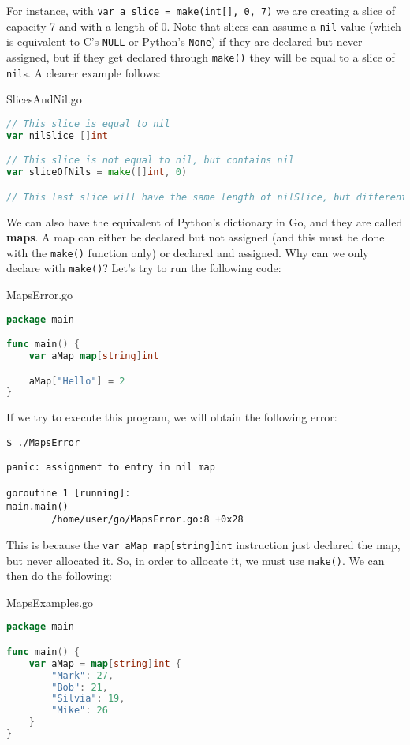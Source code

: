 \pagebreak
For instance, with \verb|var a_slice = make(int[], 0, 7)| we are creating a slice of capacity 7 and with a length of 0. Note that slices can assume a \verb|nil| value (which is equivalent to C's \verb|NULL| or Python's \verb|None|) if they are declared but never assigned, but if they get declared through \verb|make()| they will be equal to a slice of \verb|nil|s. A clearer example follows:

\begin{codeblock}{SlicesAndNil.go}
    \begin{lstlisting}[language = go]
// This slice is equal to nil
var nilSlice []int

// This slice is not equal to nil, but contains nil
var sliceOfNils = make([]int, 0)

// This last slice will have the same length of nilSlice, but different content\end{lstlisting}
\end{codeblock}

We can also have the equivalent of Python's dictionary in Go, and they are called \textbf{maps}. A map can either be declared but not assigned (and this must be done with the \verb|make()| function only) or declared and assigned. Why can we only declare with \verb|make()|? Let's try to run the following code:

\begin{codeblock}{MapsError.go}
    \begin{lstlisting}[language = go]
package main

func main() {
    var aMap map[string]int

    aMap["Hello"] = 2
}
    \end{lstlisting}
\end{codeblock}

If we try to execute this program, we will obtain the following error:

\begin{terminal}
    \begin{lstlisting}[style = notexterm]
 $ ./MapsError
    \end{lstlisting}
    \begin{tcolorbox}
        \begin{lstlisting}[basewidth=0.44em, numbers=none]
panic: assignment to entry in nil map

goroutine 1 [running]:
main.main()
        /home/user/go/MapsError.go:8 +0x28\end{lstlisting}
    \end{tcolorbox}
\end{terminal}

This is because the \verb|var aMap map[string]int| instruction just declared the map, but never allocated it. So, in order to allocate it, we must use \verb|make()|. We can then do the following:
\pagebreak
\begin{codeblock}{MapsExamples.go}
    \begin{lstlisting}[language = go]
package main

func main() {
    var aMap = map[string]int {
        "Mark": 27,
        "Bob": 21,
        "Silvia": 19,
        "Mike": 26
    }
}\end{lstlisting}
\end{codeblock}